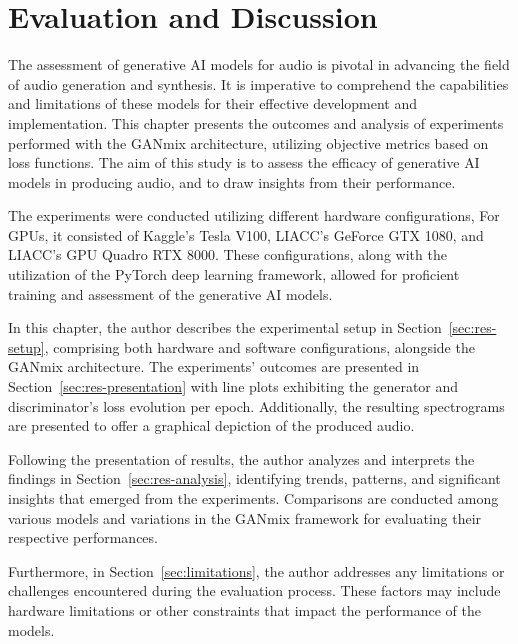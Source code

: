 \chapter{Evaluation and Discussion} \label{chap:results}

\minitoc

The assessment of generative \ac{AI} models for audio is pivotal in advancing the field of audio generation and synthesis. It is imperative to comprehend the capabilities and limitations of these models for their effective development and implementation. This chapter presents the outcomes and analysis of experiments performed with the GANmix architecture, utilizing objective metrics based on loss functions. The aim of this study is to assess the efficacy of generative \ac{AI} models in producing audio, and to draw insights from their performance.

The experiments were conducted utilizing different hardware configurations, For \acp{GPU}, it consisted of Kaggle's Tesla V100, \ac{LIACC}'s GeForce GTX 1080, and \ac{LIACC}'s GPU Quadro RTX 8000. These configurations, along with the utilization of the PyTorch deep learning framework, allowed for proficient training and assessment of the generative \ac{AI} models.

In this chapter, the author describes the experimental setup in Section~\ref{sec:res-setup}, comprising both hardware and software configurations, alongside the GANmix architecture. The experiments' outcomes are presented in Section~\ref{sec:res-presentation} with line plots exhibiting the generator and discriminator's loss evolution per epoch. Additionally, the resulting spectrograms are presented to offer a graphical depiction of the produced audio.

Following the presentation of results, the author analyzes and interprets the findings in Section~\ref{sec:res-analysis}, identifying trends, patterns, and significant insights that emerged from the experiments. Comparisons are conducted among various models and variations in the GANmix framework for evaluating their respective performances.

Furthermore, in Section~\ref{sec:limitations}, the author addresses any limitations or challenges encountered during the evaluation process. These factors may include hardware limitations or other constraints that impact the performance of the models.




